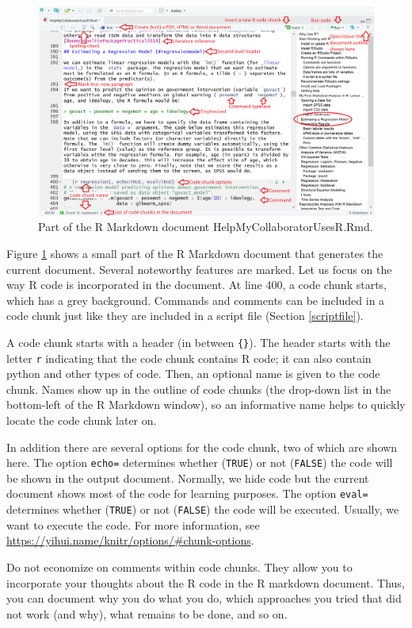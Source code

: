 \documentclass[doc,floatsintext]{apa6}
\begin{document}
\begin{figure}[h]
\includegraphics[width=6.86in]{RMarkdown} \caption{Part of the R Markdown document HelpMyCollaboratorUsesR.Rmd.}\label{fig:RMarkdown}
\end{figure}

Figure \ref{fig:RMarkdown} shows a small part of the R Markdown document
that generates the current document. Several noteworthy features are
marked. Let us focus on the way R code is incorporated in the document.
At line 400, a code chunk starts, which has a grey background. Commands
and comments can be included in a code chunk just like they are included
in a script file (Section \ref{scriptfile}).

A code chunk starts with a header (in between \texttt{\{\}}). The header
starts with the letter \texttt{r} indicating that the code chunk
contains R code; it can also contain python and other types of code.
Then, an optional name is given to the code chunk. Names show up in the
outline of code chunks (the drop-down list in the bottom-left of the R
Markdown window), so an informative name helps to quickly locate the
code chunk later on.

In addition there are several options for the code chunk, two of which
are shown here. The option \texttt{echo=} determines whether
(\texttt{TRUE}) or not (\texttt{FALSE}) the code will be shown in the
output document. Normally, we hide code but the current document shows
most of the code for learning purposes. The option \texttt{eval=}
determines whether (\texttt{TRUE}) or not (\texttt{FALSE}) the code will
be executed. Usually, we want to execute the code. For more information,
see \url{https://yihui.name/knitr/options/\#chunk-options}.

Do not economize on comments within code chunks. They allow you to
incorporate your thoughts about the R code in the R markdown document.
Thus, you can document why you do what you do, which approaches you
tried that did not work (and why), what remains to be done, and so on.
\end{document}
